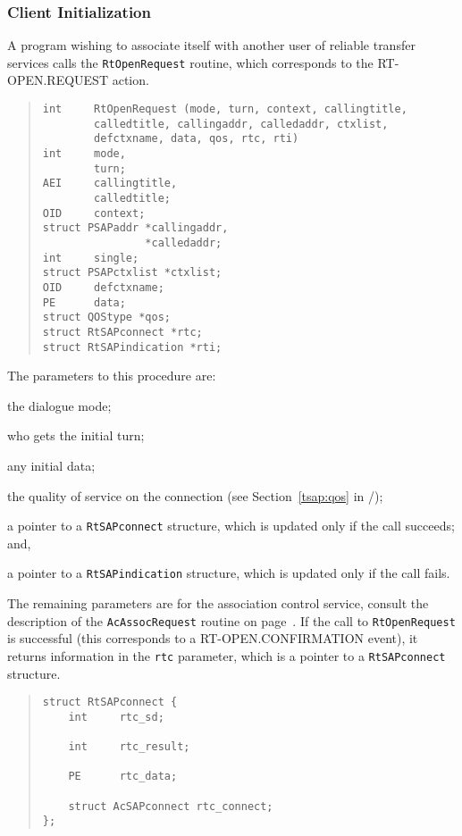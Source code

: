 \subsubsection	{Client Initialization}
A program wishing to associate itself with another user of reliable transfer
services calls the \verb"RtOpenRequest" routine,
which corresponds to the {\sf RT-OPEN.REQUEST\/} action.
\begin{quote}\small\begin{verbatim}
int     RtOpenRequest (mode, turn, context, callingtitle,
        calledtitle, callingaddr, calledaddr, ctxlist,
        defctxname, data, qos, rtc, rti)
int     mode,
        turn;
AEI     callingtitle,
        calledtitle;
OID     context;
struct PSAPaddr *callingaddr,
                *calledaddr;
int     single;
struct PSAPctxlist *ctxlist;
OID     defctxname;
PE      data;
struct QOStype *qos;
struct RtSAPconnect *rtc;
struct RtSAPindication *rti;
\end{verbatim}\end{quote}
The parameters to this procedure are:
\begin{describe}
\item[\verb"mode":] the dialogue mode;

\item[\verb"turn":] who gets the initial turn;

\item[\verb"data":] any initial data;

\item[\verb"qos":] the quality of service on the connection
(see Section~\ref{tsap:qos} in \voltwo/);

\item[\verb"rtc":] a pointer to a \verb"RtSAPconnect" structure, which is
updated only if the call succeeds;
and,

\item[\verb"rti":] a pointer to a \verb"RtSAPindication" structure, which is
updated only if the call fails.
\end{describe}
The remaining parameters are for the association control service,
consult the description of the \verb"AcAssocRequest" routine on
page~\pageref{AcAssocRequest}.
If the call to \verb"RtOpenRequest" is successful
(this corresponds to a {\sf RT-OPEN.CON\-FIR\-MA\-TION\/} event),
it returns information in the \verb"rtc" parameter,
which is a pointer to a \verb"RtSAPconnect" structure.
\begin{quote}\small\begin{verbatim}
struct RtSAPconnect {
    int     rtc_sd;

    int     rtc_result;

    PE      rtc_data;

    struct AcSAPconnect rtc_connect;
};
\end{verbatim}\end{quote}
